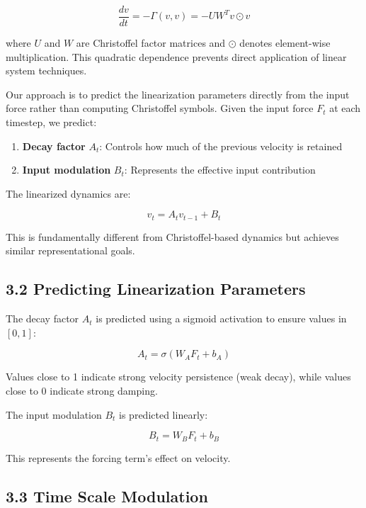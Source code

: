 \documentclass[12pt]{article}
\begin{document}
\begin{equation}
\frac{dv}{dt} = -\Gamma(v, v) = -U W^T v \odot v
\end{equation}

where $U$ and $W$ are Christoffel factor matrices and $\odot$ denotes element-wise multiplication. This quadratic dependence prevents direct application of linear system techniques.

Our approach is to predict the linearization parameters directly from the input force rather than computing Christoffel symbols. Given the input force $F_t$ at each timestep, we predict:

\begin{enumerate}
\item \textbf{Decay factor} $A_t$: Controls how much of the previous velocity is retained
\item \textbf{Input modulation} $B_t$: Represents the effective input contribution
\end{enumerate}

The linearized dynamics are:

\begin{equation}
v_t = A_t v_{t-1} + B_t
\end{equation}

This is fundamentally different from Christoffel-based dynamics but achieves similar representational goals.

\subsection{3.2 Predicting Linearization Parameters}

The decay factor $A_t$ is predicted using a sigmoid activation to ensure values in $[0, 1]$:

\begin{equation}
A_t = \sigma(W_A F_t + b_A)
\end{equation}

Values close to 1 indicate strong velocity persistence (weak decay), while values close to 0 indicate strong damping.

The input modulation $B_t$ is predicted linearly:

\begin{equation}
B_t = W_B F_t + b_B
\end{equation}

This represents the forcing term's effect on velocity.

\subsection{3.3 Time Scale Modulation}
\end{document}

